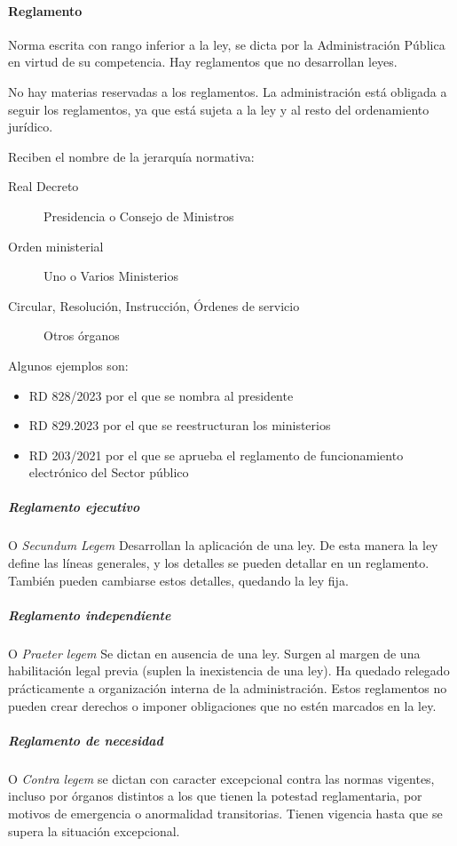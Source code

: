     \paragraph{Reglamento}
        Norma escrita con rango inferior a la ley, se dicta por la Administración Pública en virtud de su competencia. Hay reglamentos que no desarrollan leyes.

        No hay materias reservadas a los reglamentos. La administración está obligada a seguir los reglamentos, ya que está sujeta a la ley y al resto del ordenamiento jurídico.

        Reciben el nombre de la jerarquía normativa:
        \begin{description}
            \item[Real Decreto] Presidencia o Consejo de Ministros
            \item[Orden ministerial] Uno o Varios Ministerios
            \item[Circular, Resolución, Instrucción, Órdenes de servicio] Otros órganos
        \end{description}

        Algunos ejemplos son:
        \begin{itemize}
            \item RD 828/2023 por el que se nombra al presidente
            \item RD 829.2023 por el que se reestructuran los ministerios
            \item RD 203/2021 por el que se aprueba el reglamento de funcionamiento electrónico del Sector público
        \end{itemize}

        \subparagraph{Reglamento ejecutivo}
            O \textit{Secundum Legem} Desarrollan la aplicación de una ley. De esta manera la ley define las líneas generales, y los detalles se pueden detallar en un reglamento. También pueden cambiarse estos detalles, quedando la ley fija.

        \subparagraph{Reglamento independiente}
            O \textit{Praeter legem} Se dictan en ausencia de una ley. Surgen al margen de una habilitación legal previa (suplen la inexistencia de una ley). Ha quedado relegado prácticamente a organización interna de la administración. Estos reglamentos no pueden crear derechos o imponer obligaciones que no estén marcados en la ley.

        \subparagraph{Reglamento de necesidad}
            O \textit{Contra legem} se dictan con caracter excepcional contra las normas vigentes, incluso por órganos distintos a los que tienen la potestad reglamentaria, por motivos de emergencia o anormalidad transitorias. Tienen vigencia hasta que se supera la situación excepcional.
